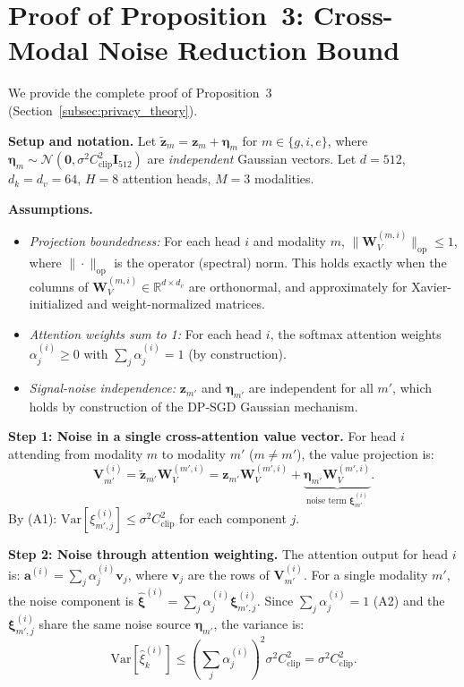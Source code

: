 \documentclass{ieeeaccess}
\begin{document}
\section{Proof of Proposition~3: Cross-Modal Noise Reduction Bound}
\label{app:proof}

We provide the complete proof of Proposition~3 (Section~\ref{subsec:privacy_theory}).

\textbf{Setup and notation.}
Let $\tilde{\mathbf{z}}_m = \mathbf{z}_m + \boldsymbol{\eta}_m$ for
$m \in \{g, i, e\}$, where $\boldsymbol{\eta}_m \!\sim\!
\mathcal{N}(\mathbf{0}, \sigma^2 C_{\mathrm{clip}}^2 \mathbf{I}_{512})$
are \emph{independent} Gaussian vectors. Let $d = 512$, $d_k = d_v = 64$,
$H = 8$ attention heads, $M = 3$ modalities.

\textbf{Assumptions.}
\begin{itemize}
\item[(A1)] \textit{Projection boundedness:} For each head $i$ and modality $m$,
  $\|\mathbf{W}_V^{(m,i)}\|_{\mathrm{op}} \leq 1$, where $\|\cdot\|_{\mathrm{op}}$
  is the operator (spectral) norm. This holds exactly when the columns of
  $\mathbf{W}_V^{(m,i)} \in \mathbb{R}^{d \times d_v}$ are orthonormal, and
  approximately for Xavier-initialized and weight-normalized matrices.
\item[(A2)] \textit{Attention weights sum to 1:}
  For each head $i$, the softmax attention weights
  $\alpha_j^{(i)} \geq 0$ with $\sum_j \alpha_j^{(i)} = 1$ (by construction).
\item[(A3)] \textit{Signal-noise independence:}
  $\mathbf{z}_{m'}$ and $\boldsymbol{\eta}_{m'}$ are independent for all $m'$,
  which holds by construction of the DP-SGD Gaussian mechanism.
\end{itemize}

\textbf{Step 1: Noise in a single cross-attention value vector.}
For head $i$ attending from modality $m$ to modality $m'$ ($m \neq m'$),
the value projection is:
\begin{equation}
\mathbf{V}_{m'}^{(i)} = \tilde{\mathbf{z}}_{m'} \mathbf{W}_V^{(m',i)}
= \mathbf{z}_{m'} \mathbf{W}_V^{(m',i)} + \underbrace{\boldsymbol{\eta}_{m'}
\mathbf{W}_V^{(m',i)}}_{\text{noise term } \boldsymbol{\xi}_{m'}^{(i)}}.
\end{equation}
By (A1): $\mathrm{Var}[\xi_{m',j}^{(i)}] \leq \sigma^2 C_{\mathrm{clip}}^2$
for each component $j$.

\textbf{Step 2: Noise through attention weighting.}
The attention output for head $i$ is:
$\mathbf{a}^{(i)} = \sum_j \alpha_j^{(i)} \mathbf{v}_j$,
where $\mathbf{v}_j$ are the rows of $\mathbf{V}_{m'}^{(i)}$. For a single
modality $m'$, the noise component is
$\hat{\boldsymbol{\xi}}^{(i)} = \sum_j \alpha_j^{(i)} \boldsymbol{\xi}_{m',j}^{(i)}$.
Since $\sum_j \alpha_j^{(i)} = 1$ (A2) and the $\boldsymbol{\xi}_{m',j}^{(i)}$
share the same noise source $\boldsymbol{\eta}_{m'}$, the variance is:
\begin{equation}
\mathrm{Var}[\hat{\xi}_k^{(i)}] \leq \left(\sum_j \alpha_j^{(i)}\right)^2
\sigma^2 C_{\mathrm{clip}}^2 = \sigma^2 C_{\mathrm{clip}}^2.
\end{equation}
\end{document}
